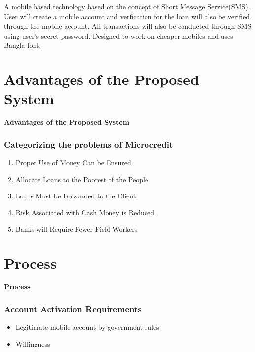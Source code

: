 \documentclass{beamer}
\begin{document}
\begin{frame}


\begin{center}
A mobile based technology based on the concept of Short Message Service(SMS). User will create a mobile account and verfication for the loan will also be verified through the mobile account. All transactions will also be conducted through SMS using user's secret password. Designed to work on cheaper mobiles and uses Bangla font.
\end{center}

\end{frame}

\section{Advantages of the Proposed System}
\begin{frame}
\begin{center}
{\LARGE \textbf{Advantages of the Proposed System}}
\end{center}
\end{frame}

\begin{frame}
\frametitle{Categorizing the problems of Microcredit}
\begin{enumerate}
\item Proper Use of Money Can be Ensured \pause
\item Allocate Loans to the Poorest of the People \pause
\item Loans Must be Forwarded to the Client \pause
\item Risk Associated with Cash Money is Reduced \pause
\item Banks will Require Fewer Field Workers \pause
\end{enumerate}
\end{frame}

\section{Process}
\begin{frame}
\begin{center}
{\LARGE \textbf{Process}}
\end{center}
\end{frame}





\begin{frame}
\frametitle{Account Activation Requirements}
\begin{itemize}
\item Legitimate mobile account by government rules
\item Willingness
\end{itemize}
\end{frame}
\end{document}
